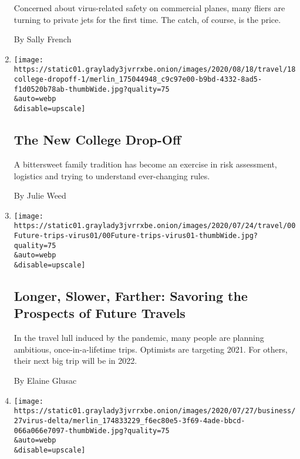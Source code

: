 \begin{enumerate}
  Concerned about virus-related safety on commercial planes, many fliers
  are turning to private jets for the first time. The catch, of course,
  is the price.

  By Sally French
\item
  \href{/2020/07/29/travel/virus-college-travel-restrictions.html}{}

  \texttt{[image: https://static01.graylady3jvrrxbe.onion/images/2020/08/18/travel/18college-dropoff-1/merlin\_175044948\_c9c97e00-b9bd-4332-8ad5-f1d0520b78ab-thumbWide.jpg?quality=75\\\&auto=webp\\\&disable=upscale]}

  \hypertarget{the-new-college-drop-off}{%
  \subsection{The New College Drop-Off}\label{the-new-college-drop-off}}

  A bittersweet family tradition has become an exercise in risk
  assessment, logistics and trying to understand ever-changing rules.

  By Julie Weed
\item
  \href{/2020/07/28/travel/future-travel-bucket-list-coronavirus.html}{}

  \texttt{[image: https://static01.graylady3jvrrxbe.onion/images/2020/07/24/travel/00Future-trips-virus01/00Future-trips-virus01-thumbWide.jpg?quality=75\\\&auto=webp\\\&disable=upscale]}

  \hypertarget{longer-slower-farther-savoring-the-prospects-of-future-travels}{%
  \subsection{Longer, Slower, Farther: Savoring the Prospects of Future
  Travels}\label{longer-slower-farther-savoring-the-prospects-of-future-travels}}

  In the travel lull induced by the pandemic, many people are planning
  ambitious, once-in-a-lifetime trips. Optimists are targeting 2021. For
  others, their next big trip will be in 2022.

  By Elaine Glusac
\item
  \href{/2020/07/27/business/delta-airlines-bill-lentsch.html}{}

  \texttt{[image: https://static01.graylady3jvrrxbe.onion/images/2020/07/27/business/27virus-delta/merlin\_174833229\_f6ec80e5-3f69-4ade-bbcd-066a066e7097-thumbWide.jpg?quality=75\\\&auto=webp\\\&disable=upscale]}


\end{enumerate}
